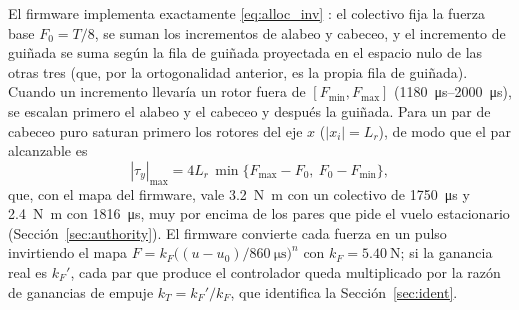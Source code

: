 El firmware implementa exactamente \eqref{eq:alloc_inv} \cite{johansen2013}: el colectivo fija la fuerza base $F_0=T/8$, se suman los incrementos de alabeo y cabeceo, y el incremento de guiñada se suma según la fila de guiñada proyectada en el espacio nulo de las otras tres (que, por la ortogonalidad anterior, es la propia fila de guiñada). Cuando un incremento llevaría un rotor fuera de $[F_{\min},F_{\max}]$ (\SIrange{1180}{2000}{\micro\second}), se escalan primero el alabeo y el cabeceo y después la guiñada. Para un par de cabeceo puro saturan primero los rotores del eje $x$ ($|x_i|=L_r$), de modo que el par alcanzable es
\begin{equation}
  |\tau_y|_{\max}=4L_r\,\min\{F_{\max}-F_0,\ F_0-F_{\min}\},
  \label{eq:taumax}
\end{equation}
que, con el mapa del firmware, vale \SI{3.2}{\newton\metre} con un colectivo de \SI{1750}{\micro\second} y \SI{2.4}{\newton\metre} con \SI{1816}{\micro\second}, muy por encima de los pares que pide el vuelo estacionario (Sección~\ref{sec:authority}). El firmware convierte cada fuerza en un pulso invirtiendo el mapa $F=k_F\big((u-u_0)/\SI{860}{\micro\second}\big)^n$ con $k_F=\SI{5.40}{\newton}$; si la ganancia real es $k_F'$, cada par que produce el controlador queda multiplicado por la razón de ganancias de empuje $k_T=k_F'/k_F$, que identifica la Sección~\ref{sec:ident}.


